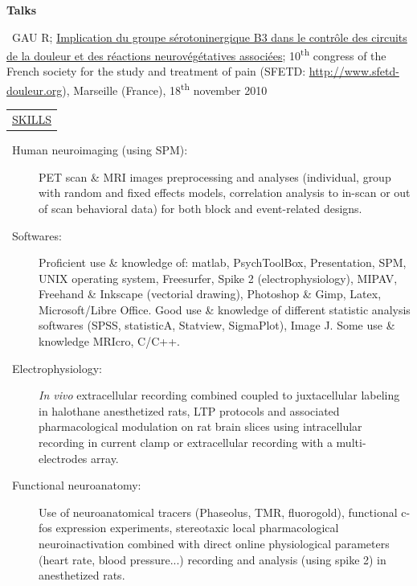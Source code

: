 \documentclass[a4paper,12pt,oneside]{letter}
\begin{document}
{\begin{center}
\Large\textbf{Talks}
\end{center}

\textbullet~GAU R; \href{http://www.sfetd-douleur.org/ModuleEventPublic/viewPresentation.phtml?about=rc\%2f2010\%2f10econgres\%2f10e-congre\%2fsession\%2f20101118-0845-20\%2f1015-62\%2f_container}{Implication du groupe sérotoninergique B3 dans le contrôle des circuits de la douleur et des réactions neurovégétatives associées}; 10\textsuperscript{th} congress of the French society for the study and treatment of pain (SFETD: \url{http://www.sfetd-douleur.org}), Marseille (France), 18\textsuperscript{th} november 2010

\begin{tabular}{B}
\underline{SKILLS}
\end{tabular}

\begin{description}
\item[\textbullet~Human neuroimaging (using SPM):] PET scan \& MRI images preprocessing and analyses (individual, group with random and fixed effects models, correlation analysis to in-scan or out of scan behavioral data) for both block and event-related designs.\\

\item [\textbullet~Softwares:] Proficient use \& knowledge of: matlab, PsychToolBox, Presentation, SPM, UNIX operating system, Freesurfer, Spike 2 (electrophysiology), MIPAV, Freehand \& Inkscape (vectorial drawing), Photoshop \& Gimp, Latex, Microsoft/Libre Office. Good use \& knowledge of different statistic analysis softwares (SPSS, statisticA, Statview, SigmaPlot), Image J. Some use \& knowledge MRIcro, C/C++.

\item [\textbullet~Electrophysiology:] \textit{In vivo} extracellular recording combined coupled to juxtacellular labeling in halothane anesthetized rats, LTP protocols and associated pharmacological modulation on rat brain slices using intracellular recording in current clamp or extracellular recording with a multi-electrodes array. 

\item [\textbullet~Functional neuroanatomy:] Use of neuroanatomical tracers (Phaseolus, TMR, fluorogold), functional c-fos expression experiments, stereotaxic local pharmacological neuroinactivation combined with direct online physiological parameters (heart rate, blood pressure...) recording and analysis (using spike 2) in anesthetized rats. 


\end{description}}
\end{document}
